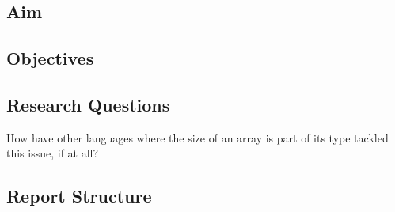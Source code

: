 
\subsection{Aim}


\subsection{Objectives}


\subsection{Research Questions}

How have other languages where the size of an array is part of its type tackled
this issue, if at all?

\subsection{Report Structure}
